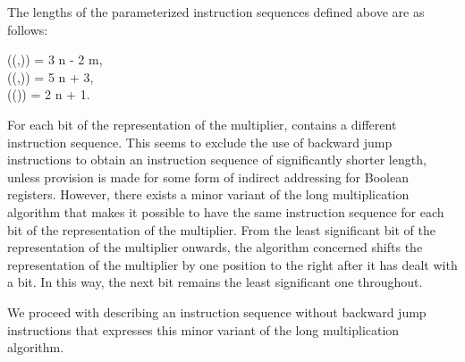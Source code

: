 \documentclass{llncs}
\begin{document}
The lengths of the parameterized instruction sequences defined above are 
as follows:
\begin{ldispl}
\len((,)) = 3 \mul n - 2 \mul m\;, \\
\len((,)) = 5 \mul n + 3\;, \\
\len(()) = 2 \mul n + 1\;.
\end{ldispl}
For each bit of the representation of the multiplier,  
contains a different instruction sequence.
This seems to exclude the use of backward jump instructions to obtain 
an instruction sequence of significantly shorter length, unless 
provision is made for some form of indirect addressing for Boolean 
registers.
However, there exists a minor variant of the long multiplication 
algorithm that makes it possible to have the same instruction sequence 
for each bit of the representation of the multiplier.
From the least significant bit of the representation of the multiplier
onwards, the algorithm concerned shifts the representation of the 
multiplier by one position to the right after it has dealt with a bit.
In this way, the next bit remains the least significant one throughout.

We proceed with describing an instruction sequence without backward jump 
instructions that expresses this minor variant of the long multiplication 
algorithm.
\end{document}
